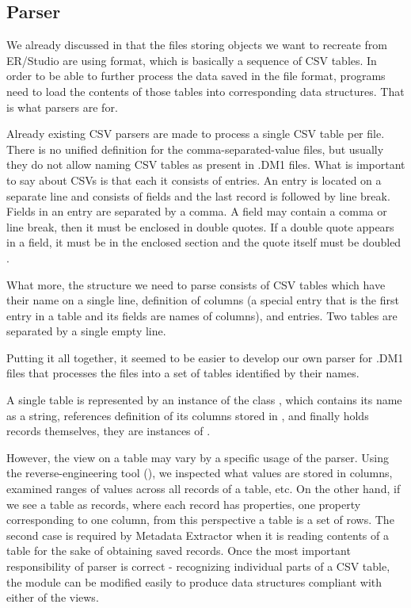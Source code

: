 \subsection{Parser}
\label{subsec:dm1_parser}

We already discussed in  that the files storing objects we want to recreate from ER/Studio are using format, which is basically a sequence of CSV tables. 
In order to be able to further process the data saved in the file format, programs need to load the contents of those tables into corresponding data structures. That is what parsers are for.

Already existing CSV parsers are made to process a single CSV table per file. There is no unified definition for the comma-separated-value files, but usually they do not allow naming CSV tables as present in .DM1 files.
What is important to say about CSVs is that each it consists of entries. 
An entry is located on a separate line and consists of fields and the last record is followed by line break. 
Fields in an entry are separated by a comma.
A field may contain a comma or line break, then it must be enclosed in double quotes.
If a double quote appears in a field, it must be in the enclosed section and the quote itself must be doubled \cite{RfcCSV}.

What more, the structure we need to parse consists of CSV tables which have their name on a single line, definition of columns (a special entry that is the first entry in a table and its fields are names of columns), and entries. 
Two tables are separated by a single empty line.

Putting it all together, it seemed to be easier to develop our own parser for .DM1 files that processes the files into a set of tables identified by their names.

A single table is represented by an instance of the class , which contains its name as a string, references definition of its columns stored in , and finally holds records themselves, they are instances of .

However, the view on a table may vary by a specific usage of the parser. 
Using the reverse-engineering tool (), we inspected what values are stored in columns, examined ranges of values across all records of a table, etc.
On the other hand, if we see a table as records, where each record has properties, one property corresponding to one column, from this perspective a table is a set of rows.
The second case is required by Metadata Extractor when it is reading contents of a table for the sake of obtaining saved records. 
Once the most important responsibility of parser is correct - recognizing individual parts of a CSV table, the module can be modified easily to produce data structures compliant with either of the views.

